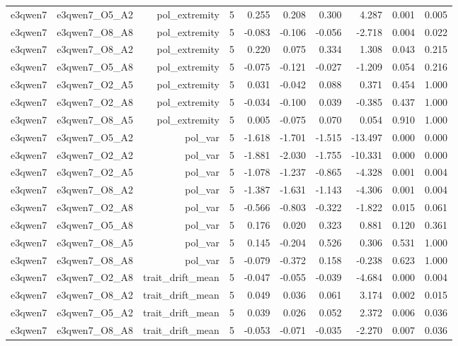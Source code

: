 \documentclass[11pt]{article}
\begin{document}
\begin{landscape}
\begin{longtable}{@{}lrrrrrrrrr@{}}
e3qwen7 & e3qwen7\_O5\_A2 & pol\_extremity & 5 & 0.255 & 0.208 & 0.300 & 4.287 & 0.001 & 0.005 \\
e3qwen7 & e3qwen7\_O8\_A8 & pol\_extremity & 5 & -0.083 & -0.106 & -0.056 & -2.718 & 0.004 & 0.022 \\
e3qwen7 & e3qwen7\_O8\_A2 & pol\_extremity & 5 & 0.220 & 0.075 & 0.334 & 1.308 & 0.043 & 0.215 \\
e3qwen7 & e3qwen7\_O5\_A8 & pol\_extremity & 5 & -0.075 & -0.121 & -0.027 & -1.209 & 0.054 & 0.216 \\
e3qwen7 & e3qwen7\_O2\_A5 & pol\_extremity & 5 & 0.031 & -0.042 & 0.088 & 0.371 & 0.454 & 1.000 \\
e3qwen7 & e3qwen7\_O2\_A8 & pol\_extremity & 5 & -0.034 & -0.100 & 0.039 & -0.385 & 0.437 & 1.000 \\
e3qwen7 & e3qwen7\_O8\_A5 & pol\_extremity & 5 & 0.005 & -0.075 & 0.070 & 0.054 & 0.910 & 1.000 \\
e3qwen7 & e3qwen7\_O5\_A2 & pol\_var & 5 & -1.618 & -1.701 & -1.515 & -13.497 & 0.000 & 0.000 \\
e3qwen7 & e3qwen7\_O2\_A2 & pol\_var & 5 & -1.881 & -2.030 & -1.755 & -10.331 & 0.000 & 0.000 \\
e3qwen7 & e3qwen7\_O2\_A5 & pol\_var & 5 & -1.078 & -1.237 & -0.865 & -4.328 & 0.001 & 0.004 \\
e3qwen7 & e3qwen7\_O8\_A2 & pol\_var & 5 & -1.387 & -1.631 & -1.143 & -4.306 & 0.001 & 0.004 \\
e3qwen7 & e3qwen7\_O2\_A8 & pol\_var & 5 & -0.566 & -0.803 & -0.322 & -1.822 & 0.015 & 0.061 \\
e3qwen7 & e3qwen7\_O5\_A8 & pol\_var & 5 & 0.176 & 0.020 & 0.323 & 0.881 & 0.120 & 0.361 \\
e3qwen7 & e3qwen7\_O8\_A5 & pol\_var & 5 & 0.145 & -0.204 & 0.526 & 0.306 & 0.531 & 1.000 \\
e3qwen7 & e3qwen7\_O8\_A8 & pol\_var & 5 & -0.079 & -0.372 & 0.158 & -0.238 & 0.623 & 1.000 \\
e3qwen7 & e3qwen7\_O2\_A8 & trait\_drift\_mean & 5 & -0.047 & -0.055 & -0.039 & -4.684 & 0.000 & 0.004 \\
e3qwen7 & e3qwen7\_O8\_A2 & trait\_drift\_mean & 5 & 0.049 & 0.036 & 0.061 & 3.174 & 0.002 & 0.015 \\
e3qwen7 & e3qwen7\_O5\_A2 & trait\_drift\_mean & 5 & 0.039 & 0.026 & 0.052 & 2.372 & 0.006 & 0.036 \\
e3qwen7 & e3qwen7\_O8\_A8 & trait\_drift\_mean & 5 & -0.053 & -0.071 & -0.035 & -2.270 & 0.007 & 0.036 \\

\end{longtable}
\end{landscape}
\end{document}
